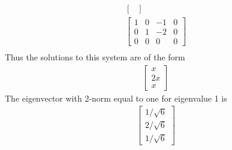 \documentclass[11pt]{article}
\begin{document}
\begin{enumerate}
\begin{enumerate}
\begin{align*}
\begin{bmatrix}
                    \end{bmatrix} \\
                    \begin{bmatrix}
                         1 & 0 & -1 & 0 \\
                         0 & 1 & -2 & 0 \\
                         0 & 0 &  0 & 0
                    \end{bmatrix} \\
                \end{align*}
                Thus the solutions to this system are of the form
                \begin{align*}
                    \begin{bmatrix}
                        x \\
                        2x \\
                        x
                    \end{bmatrix}
                \end{align*}
                The eigenvector with 2-norm equal to one for eigenvalue 1 is
                \begin{align*}
                    \begin{bmatrix}
                        1/\sqrt{6} \\
                        2/\sqrt{6} \\
                        1/\sqrt{6}
                    \end{bmatrix}
                \end{align*}


\end{enumerate}
\end{enumerate}
\end{document}
